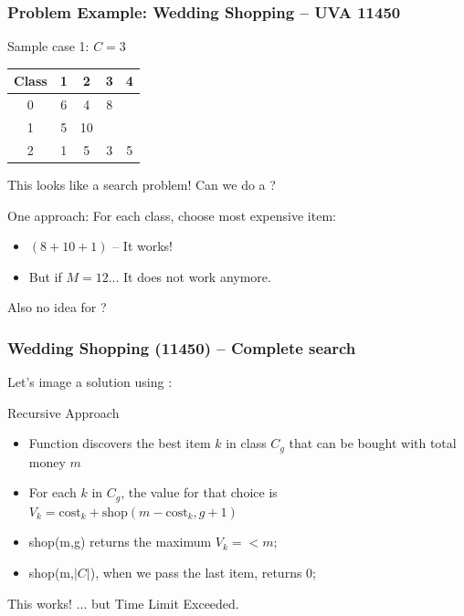 \documentclass{beamer}
\begin{document}
\begin{frame}
  \frametitle{Problem Example: Wedding Shopping -- UVA 11450}
  \begin{block}{Sample case 1: $C=3$}
  \begin{tabular}{|c|cccc|}
    Class & 1 & 2 & 3 & 4\\
    \hline
    0 & 6 & 4 & 8 & \\
    1 & 5 & 10 & & \\
    2 & 1 & 5 & 3 & 5\\
  \end{tabular}
  \end{block}

  This looks like a search problem! Can we do a ?

  \bigskip

  One approach: For each class, choose most expensive item:\\
  \begin{itemize}
  \item $(8+10+1)$ -- It works!
  \item But if $M = 12$... It does not work anymore.
  \end{itemize}

    
  \medskip

  Also no idea for ?

\end{frame}

\begin{frame}
  \frametitle{Wedding Shopping (11450) -- Complete search}
  Let's image a solution using :

  {\small
  \begin{block}{Recursive Approach}
    \begin{itemize}
    \item Function  discovers the best item $k$
      in class $C_g$ that can be bought with total money $m$
    \item For each $k$ in $C_g$, the value for that choice is $V_k =
      \text{cost}_k + \text{shop}(m - \text{cost}_k, g+1)$
    \item shop(m,g) returns the maximum $V_k =< m$;
    \item shop(m,$|C|$), when we pass the last item, returns 0;
    \end{itemize}

  \end{block}
  }
  \vfill
  
  This works! ... but Time Limit Exceeded.
\end{frame}
\end{document}
